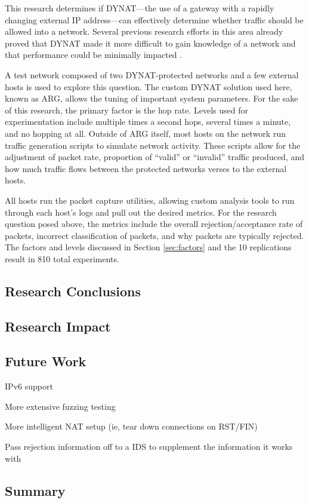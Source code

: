 \par This research determines if \ac{DYNAT}---the use of a gateway with a rapidly changing external \ac{IP} address---can effectively determine whether traffic should be allowed into a network. Several previous research efforts in this area already proved that \ac{DYNAT} made it more difficult to gain knowledge of a network \cite{BBNDYNAT} and that performance could be minimally impacted \cite{NAH}. 

\par A test network composed of two \ac{DYNAT}-protected networks and a few external hosts is used to explore this question. The custom \ac{DYNAT} solution used here, known as \ac{ARG}, allows the tuning of important system parameters. For the sake of this research, the primary factor is the hop rate. Levels used for experimentation include multiple times a second hops, several times a minute, and no hopping at all. Outside of \ac{ARG} itself, most hosts on the network run traffic generation scripts to simulate network activity. These scripts allow for the adjustment of packet rate, proportion of ``valid'' or ``invalid'' traffic produced, and how much traffic flows between the protected networks verses to the external hosts.

\par All hosts run the packet capture utilities, allowing custom analysis tools to run through each host's logs and pull out the desired metrics. For the research question posed above, the metrics include the overall rejection/acceptance rate of packets, incorrect classification of packets, and why packets are typically rejected. The factors and levels discussed in Section \ref{sec:factors} and the 10 replications result in 810 total experiments.

\subsection{Research Conclusions}

\subsection{Research Impact}


\subsection{Future Work}
\par IPv6 support
\par More extensive fuzzing testing
\par More intelligent NAT setup (ie, tear down connections on RST/FIN)
\par Pass rejection information off to a \ac{IDS} to supplement the information it works with

\subsection{Summary}

